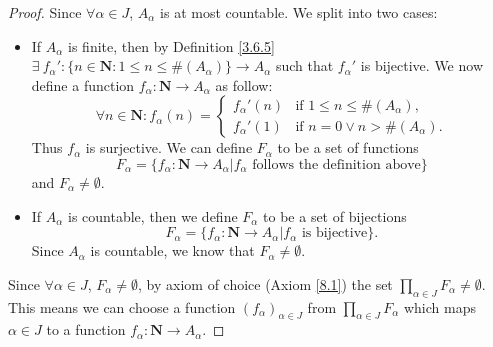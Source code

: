 \begin{proof}
    Since \(\forall \alpha \in J\), \(A_{\alpha}\) is at most countable.
    We split into two cases:
    \begin{itemize}
        \item If \(A_{\alpha}\) is finite, then by Definition \ref{3.6.5} \(\exists\ f_{\alpha}' : \{n \in \mathbf{N} : 1 \leq n \leq \#(A_{\alpha})\} \to A_{\alpha}\) such that \(f_{\alpha}'\) is bijective.
              We now define a function \(f_{\alpha} : \mathbf{N} \to A_{\alpha}\) as follow:
              \[
                  \forall n \in \mathbf{N} : f_{\alpha}(n) = \begin{cases}
                      f_{\alpha}'(n) & \text{if } 1 \leq n \leq \#(A_{\alpha}),  \\
                      f_{\alpha}'(1) & \text{if } n = 0 \lor n > \#(A_{\alpha}).
                  \end{cases}
              \]
              Thus \(f_{\alpha}\) is surjective.
              We can define \(F_{\alpha}\) to be a set of functions
              \[
                  F_{\alpha} = \{f_{\alpha} : \mathbf{N} \to A_{\alpha} | f_{\alpha} \text{ follows the definition above}\}
              \]
              and \(F_{\alpha} \neq \emptyset\).
        \item If \(A_{\alpha}\) is countable, then we define \(F_{\alpha}\) to be a set of bijections
              \[
                  F_{\alpha} = \{f_{\alpha} : \mathbf{N} \to A_{\alpha} | f_{\alpha} \text{ is bijective}\}.
              \]
              Since \(A_{\alpha}\) is countable, we know that \(F_{\alpha} \neq \emptyset\).
    \end{itemize}
    Since \(\forall \alpha \in J\), \(F_{\alpha} \neq \emptyset\), by axiom of choice (Axiom \ref{8.1}) the set \(\prod_{\alpha \in J} F_{\alpha} \neq \emptyset\).
    This means we can choose a function \((f_{\alpha})_{\alpha \in J}\) from \(\prod_{\alpha \in J} F_{\alpha}\) which maps \(\alpha \in J\) to a function \(f_{\alpha} : \mathbf{N} \to A_{\alpha}\).


\end{proof}
